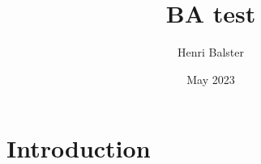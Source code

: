 \documentclass{article}
\title{BA test}
\author{Henri Balster}
\date{May 2023}
\begin{document}
\maketitle

\section{Introduction}
\end{document}
